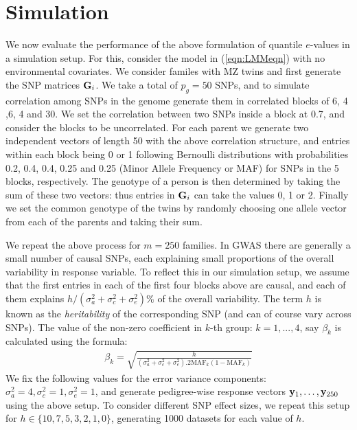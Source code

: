 \section{Simulation}
\label{sec:SimSection}

We now evaluate the performance of the above formulation of quantile $e$-values in a simulation setup. For this, consider the model in (\ref{eqn:LMMeqn}) with no environmental covariates. We consider familes with MZ twins and first generate the SNP matrices ${\mathbf{G}}_i$. We take a total of $p_g = 50$ SNPs, and to simulate correlation among SNPs in the genome generate them in correlated blocks of 6, 4 ,6, 4 and 30. We set the correlation between two SNPs inside a block at 0.7, and consider the blocks to be uncorrelated. For each parent we generate two independent vectors of length 50 with the above correlation structure, and entries within each block being 0 or 1 following Bernoulli distributions with probabilities 0.2, 0.4, 0.4, 0.25 and 0.25 (Minor Allele Frequency or MAF) for SNPs in the 5 blocks, respectively. The genotype of a person is then determined by taking the sum of these two vectors: thus entries in ${\mathbf{G}}_i$ can take the values 0, 1 or 2. Finally we set the common genotype of the twins by randomly choosing one allele vector from each of the parents and taking their sum.


We repeat the above process for $m=250$ families. In GWAS there are generally a small number of causal SNPs, each explaining small proportions of the overall variability in response variable. To reflect this in our simulation setup, we assume that the first entries in each of the first four blocks above are causal, and each of them explains $h/(\sigma_a^2+\sigma_c^2+\sigma_e^2) \%$ of the overall variability. The term $h$ is known as the \textit{heritability} of the corresponding SNP (and can of course vary across SNPs). The value of the non-zero coefficient in $k$-th group: $k = 1, ..., 4$, say $\beta_k$ is calculated using the formula:
%
\begin{align}
\beta_k = \sqrt{ \frac{h}{(\sigma_a^2+\sigma_c^2+\sigma_e^2). 2 \text{MAF}_k (1 - \text{MAF}_k) }}
\end{align}
%
We fix the following values for the error variance components: $\sigma_a^2 = 4, \sigma_c^2 = 1, \sigma_e^2 = 1$, and generate pedigree-wise response vectors ${\bf{y}}_1, \ldots, {\bf{y}}_{250}$ using the above setup. To consider different SNP effect sizes, we repeat this setup for $h \in \{10, 7, 5, 3, 2, 1, 0 \}$, generating 1000 datasets for each value of $h$.

